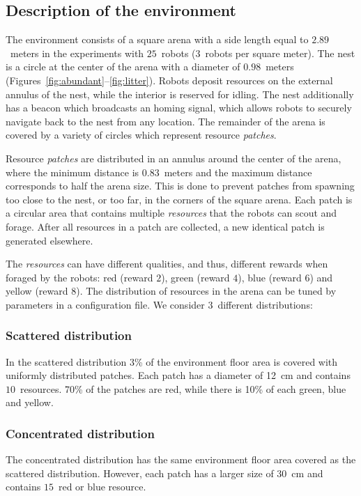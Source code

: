 \documentclass[runningheads]{llncs}
\begin{document}
\subsection{Description of the environment}
\label{subsec:env}

The environment consists of a square arena with a side length equal to $2.89$~meters in the experiments with $25$~robots ($3$~robots per square meter). The nest is a circle at the center of the arena with a diameter of $0.98$~meters (Figures~\ref{fig:abundant}--\ref{fig:litter}). Robots deposit resources on the external annulus of the nest, while the interior is reserved for idling. The nest additionally has a beacon which broadcasts an homing signal, which allows robots to securely navigate back to the nest from any location. The remainder of the arena is covered by a variety of circles which represent resource \emph{patches}.

Resource \emph{patches} are distributed in an annulus around the center of the arena, where the minimum distance is $0.83$~meters and the maximum distance corresponds to half the arena size. This is done to prevent patches from spawning too close to the nest, or too far, in the corners of the square arena. Each patch is a circular area that contains multiple \emph{resources} that the robots can scout and forage. After all resources in a patch are collected, a new identical patch is generated elsewhere.

The \emph{resources} can have different qualities, and thus, different rewards when foraged by the robots: red (reward $2$), green (reward $4$), blue (reward $6$) and yellow (reward $8$). 
The distribution of resources in the arena can be tuned by parameters in a configuration file. We consider $3$~different distributions:

\vspace{-4mm}
\subsubsection{Scattered distribution} 
In the scattered distribution $3$\% of the environment floor area is covered with uniformly distributed patches. Each patch has a diameter of 12~cm and contains $10$~resources. 70\% of the patches are red, while there is 10\% of each green, blue and yellow.

\vspace{-4mm}
\subsubsection{Concentrated distribution}
The concentrated distribution has the same environment floor area covered as the scattered distribution. However, each patch has a larger size of 30~cm and contains $15$~red or blue resource. 
\end{document}
